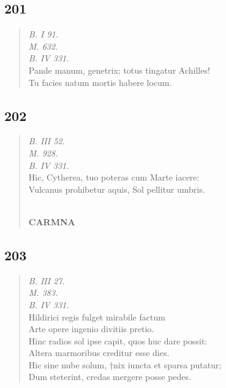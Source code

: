 \documentclass[11pt, a4paper]{report}
\begin{document}
            \subsection*{201}
      \begin{verse}
      \textit{B. I 91.} \\ \textit{M. 632.} \\ \textit{B. IV 331.} \\ Pande manum, genetrix; totus tingatur Achilles! \\ Tu facies natum mortis habere locum. \\ 
      \end{verse}
  
            \subsection*{202}
      \begin{verse}
      \textit{B. III 52.} \\ \textit{M. 928.} \\ \textit{B. IV 331.} \\ Hic, Cytherea, tuo poteras cum Marte iacere: \\ Vulcanus prohibetur aquis, Sol pellitur umbris. \\ 
        ﻿\pagebreak 
     \marginpar{[176]} \begin{center} \textbf{CARMNA} \end{center}
      \end{verse}
  
            \subsection*{203}
      \begin{verse}
      \textit{B. III 27.} \\ \textit{M. 383.} \\ \textit{B. IV 331.} \\ Hildirici regis fulget mirabile factum \\ Arte opere ingenio divitiis pretio. \\ Hinc radios sol ipse capit, quos huc dare possit: \\ Altera marmoribus creditur esse dies. \\ Hic sine nube solum, †nix iuncta et sparsa putatur; \\ Dum steterint, credas mergere posse pedes. \\ 
      \end{verse}
  
\end{document}
